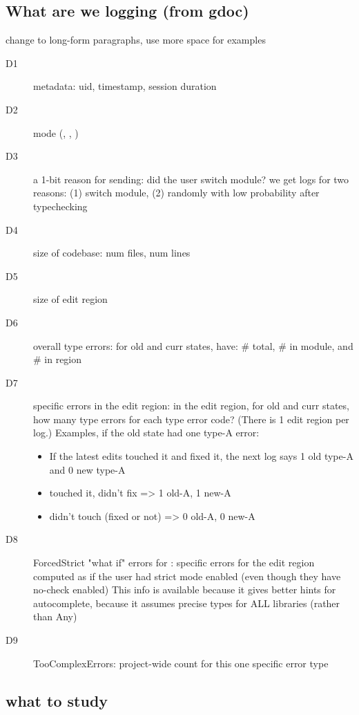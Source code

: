 \documentclass[
  acmsmall,
  review,
  anonymous,
]{acmart}
\begin{document}
\subsection{What are we logging (from gdoc)}

\FILL{} change to long-form paragraphs, use more space for examples

\begin{description}
  \item[D1] metadata: uid, timestamp, session duration
  \item[D2] mode (\mnocheck{}, \mnonstrict{}, \mstrict{})
  \item[D3] a 1-bit reason for sending: did the user switch module?
    \subitem we get logs for two reasons: (1) switch module, (2) randomly with
    low probability after typechecking
  \item[D4] size of codebase: num files, num lines
  \item[D5] size of edit region
  \item[D6] overall type errors: for old and curr states, have: \# total, \# in module, and \# in region
  \item[D7] specific errors in the edit region: in the edit region, for old and
    curr states, how many type errors for each type error code? (There is 1
    edit region per log.)
    \subitem Examples, if the old state had one type-A error:
    \begin{itemize}
      \item If the latest edits touched it and fixed it, the next log says 1
        old type-A and 0 new type-A
      \item touched it, didn't fix => 1 old-A, 1 new-A
      \item didn't touch (fixed or not) => 0 old-A, 0 new-A
    \end{itemize}
  \item[D8] ForcedStrict "what if" errors for \mnocheck{}: specific errors for the
    edit region computed as if the user had strict mode enabled (even though they
    have no-check enabled)
    \subitem This info is available because it gives better hints for
    autocomplete, because it assumes precise types for ALL libraries (rather
    than Any)
  \item[D9] TooComplexErrors: project-wide count for this one specific error type
\end{description}


\subsection{what to study}
\end{document}
